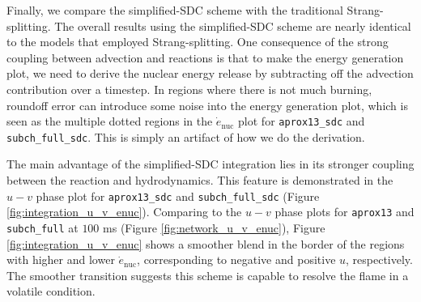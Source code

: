 \documentclass[preprint,times,tighten]{aastex631}
\begin{document}
\begin{figure*}
\centering
{}
\caption{\label{fig:integration_enuc} Slice plots comparing $\dot{e}_{\textrm{nuc}}$ for {\tt aprox13\_sdc} (top panel) and {\tt subch\_full\_sdc} (bottom panel) at $t = 50$ ms.}
\end{figure*}


Finally, we compare the simplified-SDC scheme with the traditional Strang-splitting. The overall results using the simplified-SDC scheme are nearly identical to the models that employed Strang-splitting.
One consequence of the strong coupling between advection and reactions is that to make the energy generation plot, we need to derive the nuclear energy release by subtracting off the advection contribution over a timestep.  In regions where there is not much burning, roundoff error can introduce some noise into the energy generation plot, which is seen as the multiple dotted regions in the $\dot{e}_{\textrm{nuc}}$ plot for {\tt aprox13\_sdc} and {\tt subch\_full\_sdc}.  This is simply an artifact of how we do
the derivation.


\begin{figure*}
\centering
{}
\caption{\label{fig:integration_u_v_enuc} $u-v$ phase plots for {\tt aprox13\_sdc} (left panel) and {\tt subch\_full\_sdc} (right panel) at $t = 100$ms.}
\end{figure*}


The main advantage of the simplified-SDC integration lies in its stronger coupling between the reaction and hydrodynamics. This feature is demonstrated in the $u-v$ phase plot for {\tt aprox13\_sdc} and {\tt subch\_full\_sdc} (Figure \ref{fig:integration_u_v_enuc}). Comparing to the $u-v$ phase plots for {\tt aprox13} and {\tt subch\_full} at $100$ ms (Figure \ref{fig:network_u_v_enuc}), Figure \ref{fig:integration_u_v_enuc} shows a smoother blend in the border of the regions with higher and lower $\dot{e}_{\textrm{nuc}}$, corresponding to negative and positive $u$, respectively. The smoother transition suggests this scheme is capable to resolve the flame in a volatile condition. 
\end{document}

